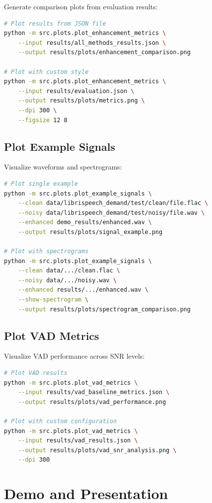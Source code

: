 \documentclass[12pt,a4paper]{article}
\begin{document}
Generate comparison plots from evaluation results:

\begin{lstlisting}[language=bash]
# Plot results from JSON file
python -m src.plots.plot_enhancement_metrics \
    --input results/all_methods_results.json \
    --output results/plots/enhancement_comparison.png

# Plot with custom style
python -m src.plots.plot_enhancement_metrics \
    --input results/evaluation.json \
    --output results/plots/metrics.png \
    --dpi 300 \
    --figsize 12 8
\end{lstlisting}

\subsection{Plot Example Signals}

Visualize waveforms and spectrograms:

\begin{lstlisting}[language=bash]
# Plot single example
python -m src.plots.plot_example_signals \
    --clean data/librispeech_demand/test/clean/file.flac \
    --noisy data/librispeech_demand/test/noisy/file.wav \
    --enhanced demo_results/enhanced.wav \
    --output results/plots/signal_example.png

# Plot with spectrograms
python -m src.plots.plot_example_signals \
    --clean data/.../clean.flac \
    --noisy data/.../noisy.wav \
    --enhanced results/.../enhanced.wav \
    --show-spectrogram \
    --output results/plots/spectrogram_comparison.png
\end{lstlisting}

\subsection{Plot VAD Metrics}

Visualize VAD performance across SNR levels:

\begin{lstlisting}[language=bash]
# Plot VAD results
python -m src.plots.plot_vad_metrics \
    --input results/vad_baseline_metrics.json \
    --output results/plots/vad_performance.png

# Plot with custom configuration
python -m src.plots.plot_vad_metrics \
    --input results/vad_results.json \
    --output results/plots/vad_snr_analysis.png \
    --dpi 300
\end{lstlisting}

\section{Demo and Presentation}
\end{document}
